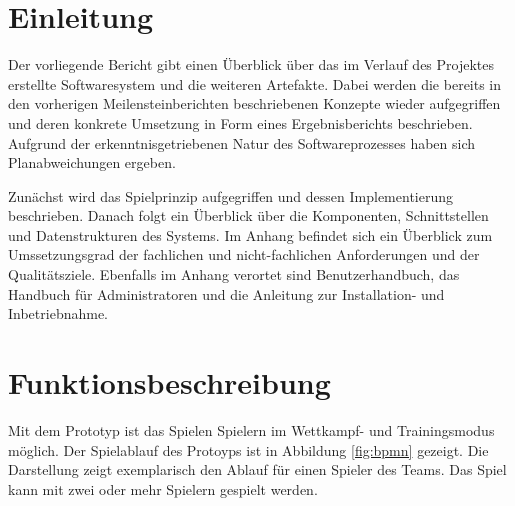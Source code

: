 \documentclass[a4paper,11pt,listof=numbered,glossary=totoc,parskip=half,toc=bib]{scrreprt}
\begin{document}
	\newpage
	\renewcommand \thechapter{\arabic{chapter}}
	\setcounter{chapter}{0}
	
	\chapter{Einleitung}
	Der vorliegende Bericht gibt einen Überblick über das im Verlauf des Projektes erstellte Softwaresystem und die weiteren Artefakte. Dabei werden die bereits in den vorherigen Meilensteinberichten beschriebenen Konzepte wieder aufgegriffen und deren konkrete Umsetzung in Form eines Ergebnisberichts beschrieben. Aufgrund der erkenntnisgetriebenen Natur des Softwareprozesses haben sich Planabweichungen ergeben.
	
	Zunächst wird das Spielprinzip aufgegriffen und dessen Implementierung beschrieben. Danach folgt ein Überblick über die Komponenten, Schnittstellen und Datenstrukturen des Systems. Im Anhang befindet sich ein Überblick zum Umssetzungsgrad der fachlichen und nicht-fachlichen Anforderungen und der Qualitätsziele. Ebenfalls im Anhang verortet sind Benutzerhandbuch, das Handbuch für Administratoren und die Anleitung zur Installation- und Inbetriebnahme.
	
	\chapter{Funktionsbeschreibung}
	Mit dem Prototyp ist das Spielen Spielern im Wettkampf- und Trainingsmodus möglich. Der Spielablauf des Protoyps ist in Abbildung \ref{fig:bpmn} gezeigt. 
	Die Darstellung zeigt exemplarisch den Ablauf für einen Spieler des Teams. Das Spiel kann mit zwei oder mehr Spielern gespielt werden. 
		
\end{document}
